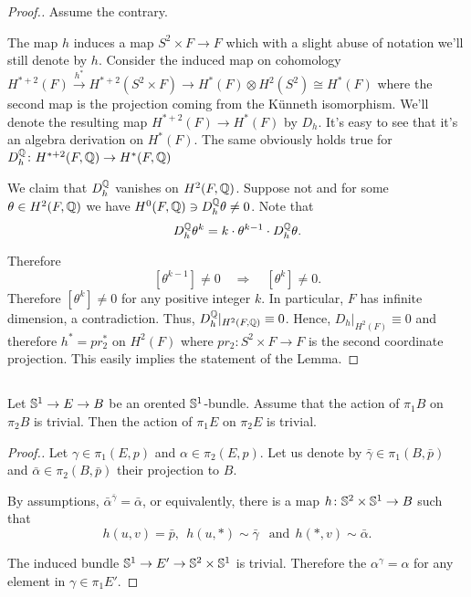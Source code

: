 \documentclass{amsart}
\begin{document}
\begin{proof}[Proof.] Assume the contrary. 

The map $h$ induces a map $S^2\times F\to F$ which with a  slight abuse of notation we'll still denote by $h$. Consider the induced map on cohomology
$H^{*+2}(F)\overset{h^*}{\longrightarrow} H^{*+2}(S^2\times F)\to H^*(F)\otimes H^2(S^2)\cong  H^*(F)$ where the second map is the projection coming from the K\"unneth isomorphism.
We'll denote the resulting map $H^{*+2}(F)\to H^*(F)$ by $D_h$. It's easy to see that it's an algebra derivation on $H^*(F)$. The same obviously holds true for $D_h^\mathbb Q\colon H^{*+2}(F,\mathbb Q)\to H^*(F,\mathbb Q)$

 We claim that  $D_h^\mathbb Q$ vanishes on $H^2(F,\mathbb Q)$. Suppose not and 
  for some 
$\theta\in H^2(F,\mathbb Q)$ we have $H^0(F,\mathbb Q)\ni D_h^\mathbb Q\theta\not=0$. 
Note that \[D_h^\mathbb Q\theta^k=k\cdot \theta^{k-1}\cdot D_h^\mathbb Q\theta.\] 




Therefore 
\[[\theta^{k-1}]\ne0
\quad
\Longrightarrow
\quad[\theta^{k}]\ne0.\]
Therefore $[\theta^{k}]\not=0$ for any positive integer $k$.
In particular, $F$ has infinite dimension, a contradiction. 
Thus, $D^\mathbb Q_h|_{H^2(F,\mathbb Q)}\equiv 0$. Hence, $D_h|_{H^2(F)}\equiv 0$ and therefore $h^*=pr_2^*$ on $H^2(F)$ where $pr_2\colon S^2\times F\to F$ is the second coordinate projection. This  easily implies the statement of the Lemma.
\end{proof}


\subsection{}

\begin{claim}
Let ${\Bbb S}^1\to E\to B$ be an orented ${\Bbb S}^1$-bundle.
Assume that the action of $\pi_1B$ 
on $\pi_2B$ is trivial. 
Then  the action of $\pi_1E$ on $\pi_2E$ is trivial.
\end{claim}

\begin{proof}[Proof.] 
Let $\gamma\in \pi_1(E,p)$ and $\alpha\in \pi_2(E,p)$. 
Let us denote by $\bar\gamma\in \pi_1(B,\bar p)$ and 
$\bar\alpha\in \pi_2(B,\bar p)$ their projection to $B$.

By assumptions, $\bar\alpha^{\bar\gamma}=\bar\alpha$, or equivalently, there is a  map
$h\colon {\Bbb S}^2\times {\Bbb S}^1\to B$ such that 
$$h(u,v)=\bar p,\ \ 
h(u,*)\sim\bar\gamma\ \ \text{ and}\ \ 
h(*,v)\sim\bar\alpha.$$

The induced bundle ${\Bbb S}^1\to E'\to {\Bbb S}^2\times {\Bbb S}^1$ is trivial. 
Therefore the $\alpha^\gamma=\alpha$ 
for any element in $\gamma\in \pi_1E'$.
\end{proof}
\end{document}
